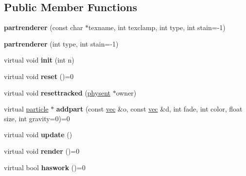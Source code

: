 \subsection*{Public Member Functions}
\begin{DoxyCompactItemize}
\item 
\mbox{\label{structpartrenderer_acb4cb9a44548bf3fb581b46796fe0c17}} 
{\bfseries partrenderer} (const char $\ast$texname, int texclamp, int type, int stain=-\/1)
\item 
\mbox{\label{structpartrenderer_a1d36948ba04c30335cf4a8ee4150e344}} 
{\bfseries partrenderer} (int type, int stain=-\/1)
\item 
\mbox{\label{structpartrenderer_a6c118ac0afa9d53fb97005a6e437dd27}} 
virtual void {\bfseries init} (int n)
\item 
\mbox{\label{structpartrenderer_a409946642f92061ed9930f7b1d609799}} 
virtual void {\bfseries reset} ()=0
\item 
\mbox{\label{structpartrenderer_aec23d531419bca3a5b326d0bbd257fd9}} 
virtual void {\bfseries resettracked} (\hyperlink{structphysent}{physent} $\ast$owner)
\item 
\mbox{\label{structpartrenderer_a1be1533c4a486d0bec0db1ec4de05ba7}} 
virtual \hyperlink{structparticle}{particle} $\ast$ {\bfseries addpart} (const \hyperlink{structvec}{vec} \&o, const \hyperlink{structvec}{vec} \&d, int fade, int color, float size, int gravity=0)=0
\item 
\mbox{\label{structpartrenderer_a74c2a285aae71e9db1b8207ca5e8ca6c}} 
virtual void {\bfseries update} ()
\item 
\mbox{\label{structpartrenderer_a155f35a532217d610c299afde11ea537}} 
virtual void {\bfseries render} ()=0
\item 
\mbox{\label{structpartrenderer_a59104381e830252bd43fa9cc67143152}} 
virtual bool {\bfseries haswork} ()=0
\item 
\mbox{\label{structpartrenderer_a420fabd2b996b3d27432a851d1e45d20}} 

\end{DoxyCompactItemize}
